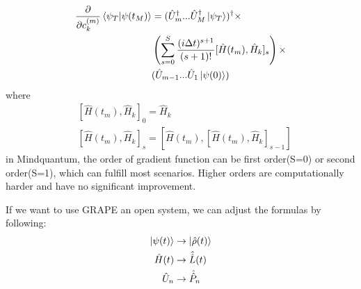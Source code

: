 \begin{equation}
    \begin{split}
        \frac{\partial}{\partial c_{k}^{(m)}}\braket{\psi_{T}|\psi(t_{M})}&=(\hat{U}_{m}^{\dagger}...\hat{U}_{M}^{\dagger}\ket{\psi_{T}})^{\dagger}\times\\
        &\left(\sum_{s=0}^{S}\frac{(i\Delta t)^{s+1}}{(s+1)!}[\hat{H}(t_m),\hat{H}_{k}]_s\right)\times\\
        &(\hat{U}_{m-1}...\hat{U}_{1}\ket{\psi(0)})
    \end{split}
\end{equation}
where
\begin{equation}
    \begin{split}
        &\left[\hat{H}(t_m),\hat{H}_{k}\right]_{0}=\hat{H}_{k}\\
        &\left[\hat{H}(t_m),\hat{H}_{k}\right]_{s}=\left[\hat{H}(t_m),\left[\hat{H}(t_m),\hat{H}_{k}\right]_{s-1}\right]
    \end{split}
\end{equation}
in Mindquantum, the order of gradient function can be first order(S=0) or second order(S=1), which can fulfill most scenarios. Higher orders are computationally harder and have no significant improvement.

If we want to use GRAPE an open system, we can adjust the formulas by following:
\begin{equation}
\begin{split}
    \ket{\psi(t)}&\to \ket{\hat{\rho}(t)}\\
    \hat{H}(t)&\to \hat{\hat{L}}(t)\\
    \hat{U}_{n}&\to \hat{\hat{P}}_{n}\\
\end{split}
\end{equation}

